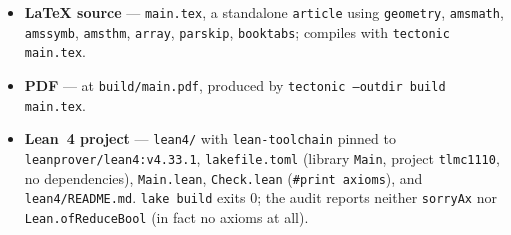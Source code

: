 \documentclass[11pt]{article}
\theoremstyle{definition}
\theoremstyle{remark}
\begin{document}
\begin{itemize}
\item \textbf{LaTeX source} --- \texttt{main.tex}, a standalone
  \texttt{article} using \texttt{geometry}, \texttt{amsmath},
  \texttt{amssymb}, \texttt{amsthm}, \texttt{array}, \texttt{parskip},
  \texttt{booktabs}; compiles with \texttt{tectonic main.tex}.
\item \textbf{PDF} --- at \texttt{build/main.pdf}, produced by
  \texttt{tectonic --outdir build main.tex}.
\item \textbf{Lean~4 project} --- \texttt{lean4/} with \texttt{lean-toolchain}
  pinned to \texttt{leanprover/lean4:v4.33.1}, \texttt{lakefile.toml}
  (library \texttt{Main}, project \texttt{tlmc1110}, no dependencies),
  \texttt{Main.lean}, \texttt{Check.lean} (\texttt{\#print axioms}), and
  \texttt{lean4/README.md}. \texttt{lake build} exits $0$; the audit reports
  neither \texttt{sorryAx} nor \texttt{Lean.ofReduceBool} (in fact no axioms
  at all).
\end{itemize}
\end{document}
